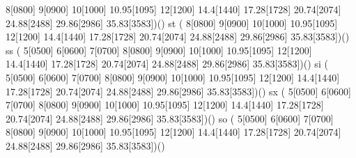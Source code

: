                            8[0800] 9[0900]
                           10[1000] 10.95[1095] 12[1200] 14.4[1440]
                           17.28[1728] 20.74[2074] 24.88[2488] 29.86[2986]
                           35.83[3583])()
     \makefont\fonttwoletters st   %
                          (%
                           8[0800] 9[0900]
                           10[1000] 10.95[1095] 12[1200] 14.4[1440]
                           17.28[1728] 20.74[2074] 24.88[2488] 29.86[2986]
                           35.83[3583])()
     \makefont\fonttwoletters ss   %
                          ( 5[0500] 6[0600] 7[0700] 8[0800] 9[0900]
                           10[1000] 10.95[1095] 12[1200] 14.4[1440]
                           17.28[1728] 20.74[2074] 24.88[2488] 29.86[2986]
                           35.83[3583])()
     \makefont\fonttwoletters si   %
                          ( 5[0500] 6[0600] 7[0700] 8[0800] 9[0900]
                           10[1000] 10.95[1095] 12[1200] 14.4[1440]
                           17.28[1728] 20.74[2074] 24.88[2488] 29.86[2986]
                           35.83[3583])()
     \makefont\fonttwoletters sx   %
                          ( 5[0500] 6[0600] 7[0700] 8[0800] 9[0900]
                           10[1000] 10.95[1095] 12[1200] 14.4[1440]
                           17.28[1728] 20.74[2074] 24.88[2488] 29.86[2986]
                           35.83[3583])()
     \makefont\fonttwoletters so   %
                          ( 5[0500] 6[0600] 7[0700] 8[0800] 9[0900]
                           10[1000] 10.95[1095] 12[1200] 14.4[1440]
                           17.28[1728] 20.74[2074] 24.88[2488] 29.86[2986]
                           35.83[3583])()
